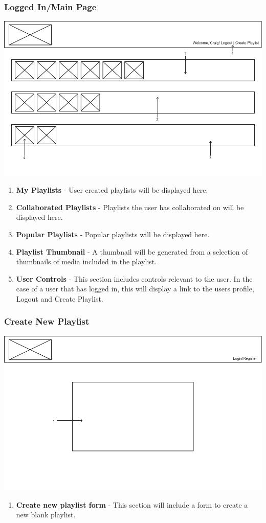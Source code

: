 \documentclass{sig-alt-release2}
\begin{document}
\subsubsection{Logged In/Main Page}
\includegraphics[scale=0.3]{img/loggedin}
\begin{enumerate}
\item \textbf{My Playlists} - User created playlists will be displayed here.
\item \textbf{Collaborated Playlists} - Playlists the user has collaborated on will be displayed here.
\item \textbf{Popular Playlists} - Popular playlists will be displayed here.
\item \textbf{Playlist Thumbnail} - A thumbnail will be generated from a selection of thumbnails of media included in the playlist.
\item \textbf{User Controls} - This section includes controls relevant to the user. In the case of a user that has logged in, this will display a link to the users profile, Logout and Create Playlist.
\end{enumerate}

\subsubsection{Create New Playlist}
\includegraphics[scale=0.3]{img/new_pl}
\begin{enumerate}
\item \textbf{Create new playlist form} - This section will include a form to create a new blank playlist.
\end{enumerate}
\end{document}
